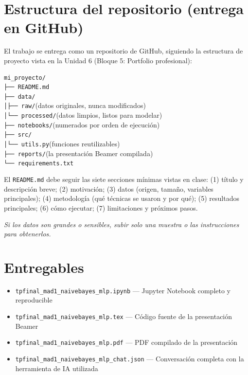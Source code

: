 \documentclass[11pt,a4paper]{article}
\newcommand{\codigo}[1]{\texttt{#1}}
\begin{document}
\section{Estructura del repositorio (entrega en GitHub)}
El trabajo se entrega como un repositorio de GitHub, siguiendo la estructura de proyecto vista en la Unidad 6 (Bloque 5: Portfolio profesional):
\begin{center}
\begin{minipage}{0.82\textwidth}
\codigo{mi\_proyecto/}\\
\codigo{\phantom{x}├── README.md}\\
\codigo{\phantom{x}├── data/}\\
\codigo{\phantom{x}│\phantom{xx}├── raw/}\hfill (datos originales, nunca modificados)\\
\codigo{\phantom{x}│\phantom{xx}└── processed/}\hfill (datos limpios, listos para modelar)\\
\codigo{\phantom{x}├── notebooks/}\hfill (numerados por orden de ejecuci\'on)\\
\codigo{\phantom{x}├── src/}\\
\codigo{\phantom{x}│\phantom{xx}└── utils.py}\hfill (funciones reutilizables)\\
\codigo{\phantom{x}├── reports/}\hfill (la presentaci\'on Beamer compilada)\\
\codigo{\phantom{x}└── requirements.txt}
\end{minipage}
\end{center}

El \codigo{README.md} debe seguir las siete secciones m\'inimas vistas en clase: (1) t\'itulo y descripci\'on breve; (2) motivaci\'on; (3) datos (origen, tama\~no, variables principales); (4) metodolog\'ia (qu\'e t\'ecnicas se usaron y por qu\'e); (5) resultados principales; (6) c\'omo ejecutar; (7) limitaciones y pr\'oximos pasos.

\textit{Si los datos son grandes o sensibles, subir solo una muestra o las instrucciones para obtenerlos.}

\section{Entregables}
\begin{itemize}[leftmargin=2em,itemsep=2pt]
    \item \codigo{tpfinal\_mad1\_naivebayes\_mlp.ipynb} --- Jupyter Notebook completo y reproducible
    \item \codigo{tpfinal\_mad1\_naivebayes\_mlp.tex} --- C\'odigo fuente de la presentaci\'on Beamer
    \item \codigo{tpfinal\_mad1\_naivebayes\_mlp.pdf} --- PDF compilado de la presentaci\'on
    \item \codigo{tpfinal\_mad1\_naivebayes\_mlp\_chat.json} --- Conversaci\'on completa con la herramienta de IA utilizada
\end{itemize}
\end{document}
